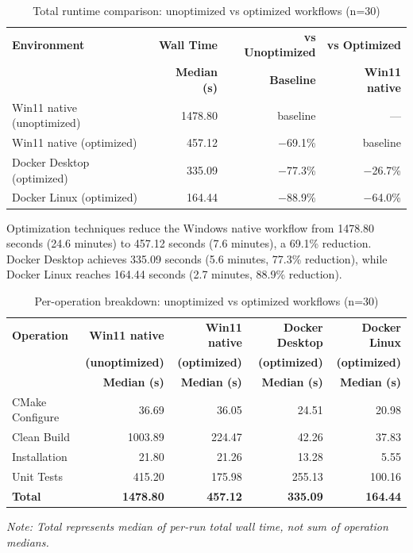 \begin{table}[ht]
    \centering
    \footnotesize
    \begin{tabular}{|l|r|r|r|}
        \hline
        \textbf{Environment} & \textbf{Wall Time} & \textbf{vs Unoptimized} & \textbf{vs Optimized} \\
        & \textbf{Median (s)} & \textbf{Baseline} & \textbf{Win11 native} \\
        \hline
        Win11 native (unoptimized) & 1478.80 & baseline & --- \\
        Win11 native (optimized) & 457.12 & $-$69.1\% & baseline \\
        Docker Desktop (optimized) & 335.09 & $-$77.3\% & $-$26.7\% \\
        Docker Linux (optimized) & 164.44 & $-$88.9\% & $-$64.0\% \\
        \hline
    \end{tabular}
    \caption{Total runtime comparison: unoptimized vs optimized workflows (n=30)}
    \label{tab:optimization_compare_total_runtime}
\end{table}

Optimization techniques reduce the Windows native workflow from 1478.80 seconds (24.6 minutes) to 457.12 seconds (7.6 minutes), a 69.1\% reduction.
Docker Desktop achieves 335.09 seconds (5.6 minutes, 77.3\% reduction), while Docker Linux reaches 164.44 seconds (2.7 minutes, 88.9\% reduction).

\begin{table}[ht]
    \centering
    \footnotesize
    \begin{tabular}{|l|r|r|r|r|}
        \hline
        \textbf{Operation} & \textbf{Win11 native} & \textbf{Win11 native} & \textbf{Docker Desktop} & \textbf{Docker Linux} \\
        & \textbf{(unoptimized)} & \textbf{(optimized)} & \textbf{(optimized)} & \textbf{(optimized)} \\
        & \textbf{Median (s)} & \textbf{Median (s)} & \textbf{Median (s)} & \textbf{Median (s)} \\
        \hline
        CMake Configure & 36.69 & 36.05 & 24.51 & 20.98 \\
        Clean Build & 1003.89 & 224.47 & 42.26 & 37.83 \\
        Installation & 21.80 & 21.26 & 13.28 & 5.55 \\
        Unit Tests & 415.20 & 175.98 & 255.13 & 100.16 \\
        \hline
        \textbf{Total} & \textbf{1478.80} & \textbf{457.12} & \textbf{335.09} & \textbf{164.44} \\
        \hline
    \end{tabular}

    \smallskip
    \footnotesize
    \textit{Note: Total represents median of per-run total wall time, not sum of operation medians.}
    \caption{Per-operation breakdown: unoptimized vs optimized workflows (n=30)}
    \label{tab:optimization_compare_breakdown}
\end{table}

